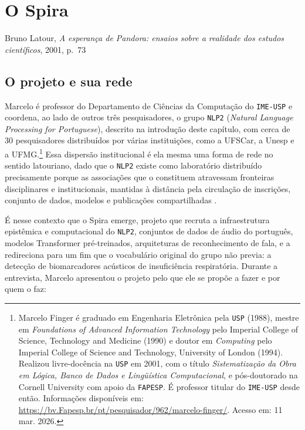 \section{O Spira}
\label{sec:marcelo_Spira}

%
{Bruno Latour, \textit{A esperança de Pandora: ensaios sobre a realidade dos estudos científicos}, 2001, p.~73}

\subsection{O projeto e sua rede}
\label{subsec:projeto_rede}

Marcelo é professor do Departamento de Ciências da Computação do \texttt{IME-USP} e coordena, ao lado de outros três pesquisadores, o grupo \texttt{NLP2} (\textit{Natural Language Processing for Portuguese}), descrito na introdução deste capítulo, com cerca de 30 pesquisadores distribuídos por várias instituições, como a UFSCar, a Unesp e a UFMG.\footnote{Marcelo Finger é graduado em Engenharia Eletrônica pela \texttt{USP} (1988), mestre em \textit{Foundations of Advanced Information Technology} pelo Imperial College of Science, Technology and Medicine (1990) e doutor em \textit{Computing} pelo Imperial College of Science and Technology, University of London (1994). Realizou livre-docência na \texttt{USP} em 2001, com o título \textit{Sistematização da Obra em Lógica, Banco de Dados e Lingüística Computacional}, e pós-doutorado na Cornell University com apoio da \texttt{FAPESP}. É professor titular do \texttt{IME-USP} desde então. Informações disponíveis em: \url{https://bv.Fapesp.br/pt/pesquisador/962/marcelo-finger/}. Acesso em: 11 mar. 2026.} Essa dispersão institucional é ela mesma uma forma de rede no sentido latouriano, dado que o \texttt{NLP2} existe como laboratório distribuído precisamente porque as associações que o constituem atravessam fronteiras disciplinares e institucionais, mantidas à distância pela circulação de inscrições, conjunto de dados, modelos e publicações compartilhadas \parencite{Latour2011CienciaEmAcao}.

É nesse contexto que o Spira emerge, projeto que recruta a infraestrutura epistêmica e computacional do \texttt{NLP2}, conjuntos de dados de áudio do português, modelos Transformer pré-treinados, arquiteturas de reconhecimento de fala, e a redireciona para um fim que o vocabulário original do grupo não previa: a detecção de biomarcadores acústicos de insuficiência respiratória. Durante a entrevista, Marcelo apresentou o projeto pelo que ele se propõe a fazer e por quem o faz:

